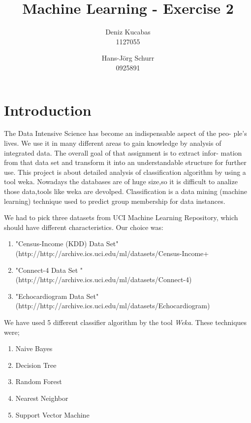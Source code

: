 \documentclass[a4paper]{article}
\begin{document}
\title{Machine Learning - Exercise 2 }
\author{
        Deniz Kucabas \\ 
                     1127055 
                    \and
                    Hans-Jörg Schurr \\ 0925891
}

\maketitle
\tableofcontents
\newpage

\section{Introduction}
The Data Intensive Science has become an indispensable aspect of the peo-
ple's lives. We use it in many different areas to gain knowledge by analysis
of integrated data. The overall goal of that assignment is to extract infor-
mation from that data set and transform it into an understandable structure
for further use. This project is about detailed analysis of classification algorithm by using a tool weka.
Nowadays the databases are of huge size,so it is difficult to analize those data,tools like weka are 
devolped. Classification is a data mining (machine learning) technique used 
to predict group membership for data instances. 

We had to pick three datasets from UCI Machine Learning Repository, which should have different characteristics. 
Our choice was:
\begin{enumerate}
    \item "Census-Income (KDD) Data Set" \\ 
(http://http://archive.ics.uci.edu/ml/datasets/Census-Income+%
    \item "Connect-4 Data Set " \\
        (http://http://archive.ics.uci.edu/ml/datasets/Connect-4)
    \item "Echocardiogram  Data Set" \\
        (http://http://archive.ics.uci.edu/ml/datasets/Echocardiogram)
\end{enumerate}

We have used 5 different classifier algorithm by the tool \emph{Weka}. 
These techniques were;
\begin{enumerate}
    \item Naive Bayes
    \item Decision Tree
    \item Random Forest
    \item Nearest Neighbor
    \item Support Vector Machine
\end{enumerate}
\end{document}

